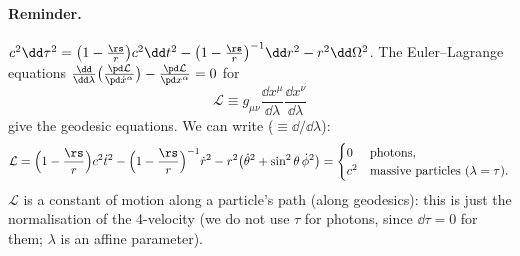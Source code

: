 \paragraph{Reminder.} $c^2\dd\tau^2=\big(1-\frac\rs r\big)c^2\dd t^2-\big(1-\frac\rs r\big)^{-1}\dd r^2-r^2\dd\Omega^2$. The Euler--Lagrange equations $\frac{\dd}{\dd\lambda}\big(\frac{\pd\mathcal L}{\pd\dot x^\alpha}\big)-\frac{\pd\mathcal L}{\pd x^\alpha}=0$ for
\[
  \mathcal L\equiv g_{\mu\nu}\frac{\dd x^\mu}{\dd\lambda}\frac{\dd x^\nu}{\dd\lambda}
\]
give the geodesic equations. We can write ($\dot{}\equiv\dd/\dd\lambda$):
\begin{equation}
  \mathcal L=\Big(1-\frac\rs r\Big)c^2\dot t^2-\Big(1-\frac\rs r\Big)^{-1}\dot r^2-r^2\big(\dot\theta^2+\sin^2\theta\,\dot\phi^2\big)=\begin{cases}0&\text{photons},\\ c^2&\text{massive particles ($\lambda=\tau$)}.\end{cases}
\end{equation}
$\mathcal L$ is a constant of motion along a particle's path (along geodesics): this is just the normalisation of the 4-velocity (we do not use $\tau$ for photons, since $\dd\tau=0$ for them; $\lambda$ is an affine parameter).

